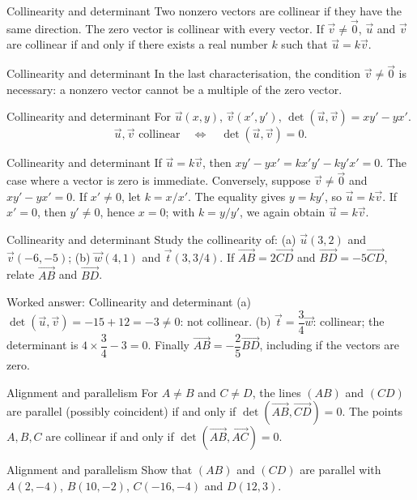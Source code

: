 \documentclass[aspectratio=169,10pt]{beamer}
\providecommand{\vect}[1]{\overrightarrow{#1}}
\begin{document}
\begin{frame}{Collinearity and determinant}
Two nonzero vectors are collinear if they have the same direction. The zero vector is collinear with every vector. If \(\vec v\ne\vec0\), \(\vec u\) and \(\vec v\) are collinear if and only if there exists a real number \(k\) such that \(\vec u=k\vec v\).
\end{frame}
\begin{frame}{Collinearity and determinant}
In the last characterisation, the condition \(\vec v\ne\vec0\) is necessary: a nonzero vector cannot be a multiple of the zero vector.
\end{frame}
\begin{frame}{Collinearity and determinant}
For \(\vec u(x,y)\), \(\vec v(x',y')\), \(\det(\vec u,\vec v)=xy'-yx'\).
\[\vec u,\vec v\text{ collinear}\quad\Longleftrightarrow\quad\det(\vec u,\vec v)=0.\]
\end{frame}
\begin{frame}{Collinearity and determinant}
If \(\vec u=k\vec v\), then \(xy'-yx'=kx'y'-ky'x'=0\). The case where a vector is zero is immediate.
Conversely, suppose \(\vec v\ne\vec0\) and \(xy'-yx'=0\). If \(x'\ne0\), let \(k=x/x'\). The equality gives \(y=ky'\), so \(\vec u=k\vec v\). If \(x'=0\), then \(y'\ne0\), hence \(x=0\); with \(k=y/y'\), we again obtain \(\vec u=k\vec v\).
\end{frame}
\begin{frame}{Collinearity and determinant}
Study the collinearity of: (a) \(\vec u(3,2)\) and \(\vec v(-6,-5)\); (b) \(\vec w(4,1)\) and \(\vec t(3,3/4)\). If \(\vect{AB}=2\vect{CD}\) and \(\vect{BD}=-5\vect{CD}\), relate \(\vect{AB}\) and \(\vect{BD}\).
\end{frame}
\begin{frame}{Worked answer: Collinearity and determinant}
(a) \(\det(\vec u,\vec v)=-15+12=-3\ne0\): not collinear. (b) \(\vec t=\dfrac34\vec w\): collinear; the determinant is \(4\times\dfrac34-3=0\). Finally \(\vect{AB}=-\dfrac25\vect{BD}\), including if the vectors are zero.
\end{frame}
\begin{frame}{Alignment and parallelism}
For \(A\ne B\) and \(C\ne D\), the lines \((AB)\) and \((CD)\) are parallel (possibly coincident) if and only if \(\det(\vect{AB},\vect{CD})=0\).
The points \(A,B,C\) are collinear if and only if \(\det(\vect{AB},\vect{AC})=0\).
\end{frame}
\begin{frame}{Alignment and parallelism}
Show that \((AB)\) and \((CD)\) are parallel with \(A(2,-4)\), \(B(10,-2)\), \(C(-16,-4)\) and \(D(12,3)\).
\end{frame}
\end{document}
